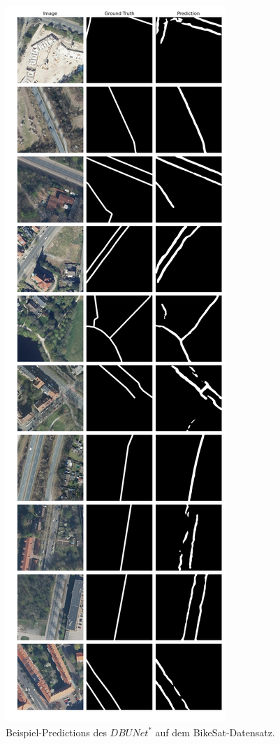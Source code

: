 \begin{figure}
	\centering
	\includegraphics[width=.41\textwidth]{Bilder/Samples-BikeSat/dbunet-s.png} 
	\caption{Beispiel-Predictions des $DBUNet^*$ auf dem BikeSat-Datensatz.}
	\label{fig:bikesat-samples-dbunet-s}
\end{figure}

